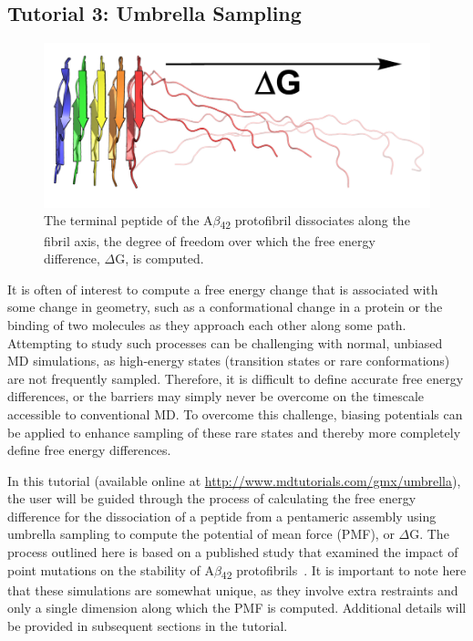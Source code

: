 \documentclass[9pt,tutorial]{livecoms}
\newcommand{\urlstring}{http://www.mdtutorials.com/gmx}
\newcommand{\tutorialpmf}{\url{\urlstring/umbrella}}
\begin{document}
\subsection{Tutorial 3: Umbrella Sampling} \label{pmf}

\begin{figure}[H]
\centering
\includegraphics{umbrella_protofibril_dissociate}
\caption{The terminal peptide of the A$\beta$\textsubscript{42} protofibril dissociates along the fibril axis, the degree of freedom over which the free energy difference, $\Delta$G, is computed.}
\label{umbrella_composite_fig}
\end{figure}

It is often of interest to compute a free energy change that is associated with some change in geometry, such as a conformational change in a protein or the binding of two molecules as they approach each other along some path. Attempting to study such processes can be challenging with normal, unbiased MD simulations, as high-energy states (transition states or rare conformations) are not frequently sampled. Therefore, it is difficult to define accurate free energy differences, or the barriers may simply never be overcome on the timescale accessible to conventional MD. To overcome this challenge, biasing potentials can be applied to enhance sampling of these rare states and thereby more completely define free energy differences.

In this tutorial (available online at \tutorialpmf), the user will be guided through the process of calculating the free energy difference for the dissociation of a peptide from a pentameric assembly using umbrella sampling to compute the potential of mean force (PMF), or $\Delta$G. The process outlined here is based on a published study that examined the impact of point mutations on the stability of A$\beta$\textsubscript{42} protofibrils~\cite{Lemkul2010}. It is important to note here that these simulations are somewhat unique, as they involve extra restraints and only a single dimension along which the PMF is computed. Additional details will be provided in subsequent sections in the tutorial.
\end{document}
